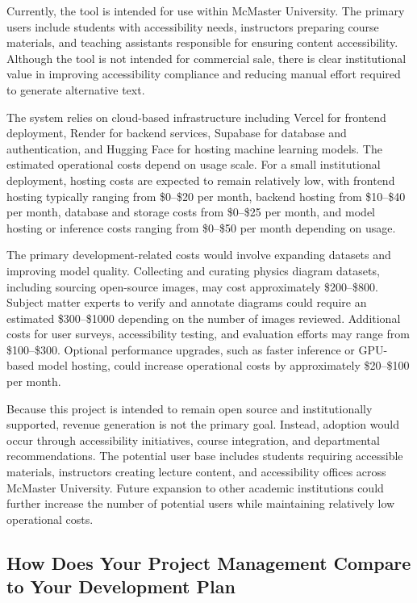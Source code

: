 \documentclass{article}
\begin{document}
Currently, the tool is intended for use within McMaster University. The primary users include students with accessibility needs, 
instructors preparing course materials, and teaching assistants responsible for ensuring content accessibility. Although the 
tool is not intended for commercial sale, there is clear institutional value in improving accessibility compliance and reducing 
manual effort required to generate alternative text.

The system relies on cloud-based infrastructure including Vercel for frontend deployment, Render for backend services, Supabase 
for database and authentication, and Hugging Face for hosting machine learning models. The estimated operational costs depend 
on usage scale. For a small institutional deployment, hosting costs are expected to remain relatively low, with frontend hosting 
typically ranging from \$0--\$20 per month, backend hosting from \$10--\$40 per month, database and storage costs from 
\$0--\$25 per month, and model hosting or inference costs ranging from \$0--\$50 per month depending on usage.

The primary development-related costs would involve expanding datasets and improving model quality. Collecting and curating 
physics diagram datasets, including sourcing open-source images, may cost approximately \$200--\$800. Subject matter experts 
to verify and annotate diagrams could require an estimated \$300--\$1000 depending on the number of images reviewed. Additional 
costs for user surveys, accessibility testing, and evaluation efforts may range from \$100--\$300. Optional performance upgrades, 
such as faster inference or GPU-based model hosting, could increase operational costs by approximately \$20--\$100 per month.

Because this project is intended to remain open source and institutionally supported, revenue generation is not the primary goal. 
Instead, adoption would occur through accessibility initiatives, course integration, and departmental recommendations. The 
potential user base includes students requiring accessible materials, instructors creating lecture content, and accessibility 
offices across McMaster University. Future expansion to other academic institutions could further increase the number of potential 
users while maintaining relatively low operational costs.

\subsection{How Does Your Project Management Compare to Your Development Plan}
\end{document}
